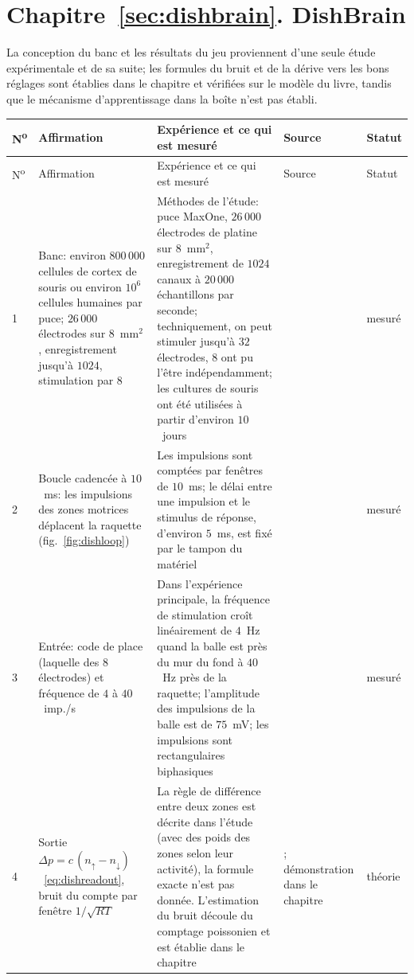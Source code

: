 \section{Chapitre~\ref{sec:dishbrain}. DishBrain}

La conception du banc et les résultats du jeu proviennent d'une seule étude expérimentale et de sa suite; les formules du bruit et de la dérive vers les bons réglages sont établies dans le chapitre et vérifiées sur le modèle du livre, tandis que le mécanisme d'apprentissage dans la boîte n'est pas établi.

{\footnotesize
\setlength{\tabcolsep}{3pt}\renewcommand{\arraystretch}{1.15}
\begin{longtable}{>{\raggedright}p{0.5cm}>{\raggedright}p{4.0cm}>{\raggedright}p{5.6cm}>{\raggedright}p{2.3cm}>{\raggedright\arraybackslash}p{1.7cm}}
\toprule
N\textsuperscript{o} & Affirmation & Expérience et ce qui est mesuré & Source & Statut \\
\midrule\endfirsthead
\toprule
N\textsuperscript{o} & Affirmation & Expérience et ce qui est mesuré & Source & Statut \\
\midrule\endhead
1 & Banc: environ $800\,000$ cellules de cortex de souris ou environ $10^6$ cellules humaines par puce; $26\,000$ électrodes sur $8$~mm$^2$, enregistrement jusqu'à $1024$, stimulation par $8$ & Méthodes de l'étude: puce MaxOne, $26\,000$ électrodes de platine sur $8$~mm$^2$, enregistrement de $1024$ canaux à $20\,000$ échantillons par seconde; techniquement, on peut stimuler jusqu'à $32$ électrodes, $8$ ont pu l'être indépendamment; les cultures de souris ont été utilisées à partir d'environ $10$~jours & \cite{Kagan2022} & mesuré \\
2 & Boucle cadencée à $10$~ms: les impulsions des zones motrices déplacent la raquette (fig.~\ref{fig:dishloop}) & Les impulsions sont comptées par fenêtres de $10$~ms; le délai entre une impulsion et le stimulus de réponse, d'environ $5$~ms, est fixé par le tampon du matériel & \cite{Kagan2022} & mesuré \\
3 & Entrée: code de place (laquelle des $8$ électrodes) et fréquence de $4$ à $40$~imp./s & Dans l'expérience principale, la fréquence de stimulation croît linéairement de $4$~Hz quand la balle est près du mur du fond à $40$~Hz près de la raquette; l'amplitude des impulsions de la balle est de $75$~mV; les impulsions sont rectangulaires biphasiques & \cite{Kagan2022} & mesuré \\
4 & Sortie $\Delta p=c\,(n_\uparrow-n_\downarrow)$~\eqref{eq:dishreadout}, bruit du compte par fenêtre $1/\sqrt{RT}$ & La règle de différence entre deux zones est décrite dans l'étude (avec des poids des zones selon leur activité), la formule exacte n'est pas donnée. L'estimation du bruit découle du comptage poissonien et est établie dans le chapitre & \cite{Kagan2022}; démonstration dans le chapitre & théorie \\

\end{longtable}}
